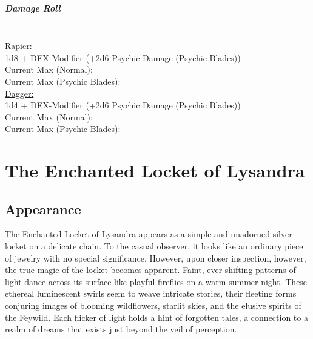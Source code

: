 \documentclass[letterpaper,openany,oneside,twocolumn]{book}
\begin{document}
\paragraph*{Damage Roll}\hfill\\
\underline{Rapier:}\\
1d8 + DEX-Modifier (+2d6 Psychic Damage (Psychic Blades))\\
\indent Current Max (Normal): \\
\indent Current Max (Psychic Blades): \\
\underline{Dagger:}\\
1d4 + DEX-Modifier (+2d6 Psychic Damage (Psychic Blades))\\
\indent Current Max (Normal): \\
\indent Current Max (Psychic Blades): \\

\chapter*{The Enchanted Locket of Lysandra}
\vspace*{10cm}
\section*{Appearance}
The Enchanted Locket of Lysandra appears as a simple and unadorned silver locket on a delicate chain. To the casual observer, it looks like an ordinary piece of jewelry with no special significance. However, upon closer inspection, however, the true magic of the locket becomes apparent. Faint, ever-shifting patterns of light dance across its surface like playful fireflies on a warm summer night. These ethereal luminescent swirls seem to weave intricate stories, their fleeting forms conjuring images of blooming wildflowers, starlit skies, and the elusive spirits of the Feywild. Each flicker of light holds a hint of forgotten tales, a connection to a realm of dreams that exists just beyond the veil of perception.
\end{document}
